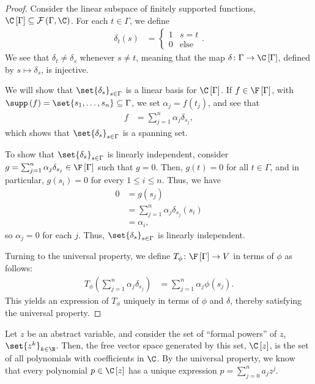 \begin{proof}
  Consider the linear subspace of finitely supported functions, $\C\left[\Gamma\right]\subseteq \mathcal{F}\left(\Gamma,\C\right)$. For each $t\in \Gamma$, we define
  \begin{align*}
    \delta_t\left(s\right) &= \begin{cases}
      1 & s=t\\
      0 & \text{else}
    \end{cases}.
  \end{align*}
    We see that $\delta_t\neq \delta_s$ whenever $s\neq t$, meaning that the map $\delta\colon \Gamma\rightarrow \C\left[\Gamma\right]$, defined by $s \mapsto \delta_s$, is injective.\newline

    We will show that $\set{\delta_s}_{s\in \Gamma}$ is a linear basis for $\C\left[\Gamma\right]$. If $f\in \F\left[\Gamma\right]$, with $\supp\left(f\right) = \set{s_1,\dots,s_n}\subseteq \Gamma$, we set $\alpha_j = f\left(t_j\right)$, and see that
    \begin{align*}
      f &= \sum_{j=1}^{n}\alpha_j\delta_{s_j},
    \end{align*}
    which shows that $\set{\delta_s}_{s\in\Gamma}$ is a spanning set.\newline

    To show that $\set{\delta_s}_{s\in\Gamma}$ is linearly independent, consider $g = \sum_{j=1}^{n}\alpha_j\delta_{s_j}\in \F\left[\Gamma\right]$ such that $g = 0$. Then, $g(t) = 0$ for all $t\in\Gamma$, and in particular, $g\left(s_i\right) = 0$ for every $1 \leq i \leq n$. Thus, we have
    \begin{align*}
      0 &= g\left(s_j\right)\\
        &= \sum_{j=1}^{n}\alpha_j\delta_{s_j}\left(s_i\right)\\
        &= \alpha_i,
    \end{align*}
    so $\alpha_j = 0$ for each $j$. Thus, $\set{\delta_s}_{s\in \Gamma}$ is linearly independent.\newline

    Turning to the universal property, we define $T_{\phi}\colon \F\left[\Gamma\right]\rightarrow V$ in terms of $\phi$ as follows:
    \begin{align*}
      T_{\phi}\left(\sum_{j=1}^{n}\alpha_j\delta_{s_j}\right) &= \sum_{j=1}^{n}\alpha_j\phi\left(s_j\right).
    \end{align*}
    This yields an expression of $T_{\phi}$ uniquely in terms of $\phi$ and $\delta$, thereby satisfying the universal property.
\end{proof}
\begin{example}
  Let $z$ be an abstract variable, and consider the set of ``formal powers'' of $z$, $\set{z^k}_{k\in\N}$. Then, the free vector space generated by this set, $\C\left[z\right]$, is the set of all polynomials with coefficients in $\C$. By the universal property, we know that every polynomial $p\in \C\left[z\right]$ has a unique expression $p = \sum_{j=0}^{n}a_jz^j$.
\end{example}
